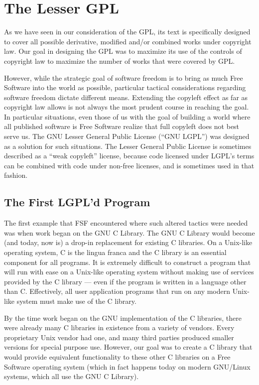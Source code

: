\chapter{The Lesser GPL}
\label{LGPLv2}

As we have seen in our consideration of the GPL, its text is specifically
designed to cover all possible derivative, modified and/or combined works under copyright law. Our
goal in designing the GPL was to maximize its use of the controls of
copyright law to maximize the number of works that were covered by GPL. 

However, while the strategic goal of software freedom is to bring as much Free Software
into the world as possible, particular tactical considerations
regarding software freedom dictate different means. Extending the
copyleft effect as far as copyright law allows is not always the most
prudent course in reaching the goal. In particular situations, even
those of us with the goal of building a world where all published
software is Free Software realize that full copyleft does not best
serve us. The GNU Lesser General Public License (``GNU LGPL'') was
designed as a solution for such situations.
The Lesser General Public License is sometimes described as a ``weak copyleft''
license, because code licensed under LGPL's terms can be combined with code
under non-free licenses, and is sometimes used in that fashion.

\section{The First LGPL'd Program}

The first example that FSF encountered where such altered tactics were
needed was when work began on the GNU C Library. The GNU C Library would
become (and today, now is) a drop-in replacement for existing C libraries.
On a Unix-like operating system, C is the lingua franca and the C library
is an essential component for all programs. It is extremely difficult to
construct a program that will run with ease on a Unix-like operating
system without making use of services provided by the C library --- even
if the program is written in a language other than C\@. Effectively, all
user application programs that run on any modern Unix-like system must
make use of the C library.

By the time work began on the GNU implementation of the C libraries, there
were already many C libraries in existence from a variety of vendors.
Every proprietary Unix vendor had one, and many third parties produced
smaller versions for special purpose use. However, our goal was to create
a C library that would provide equivalent functionality to these other C
libraries on a Free Software operating system (which in fact happens today
on modern GNU/Linux systems, which all use the GNU C Library).

